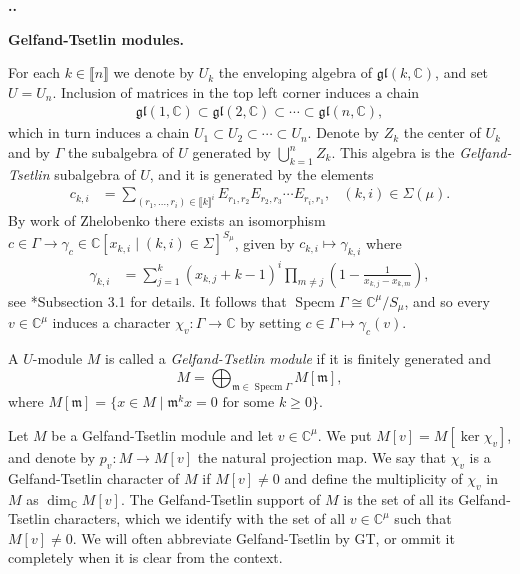 \documentclass[11pt,fleqn]{amsart}
\renewcommand\thesection{\arabic{section}}
\newcounter{para}[section]
\renewcommand\thepara{\thesection.\arabic{para}}
\def\paragraph{%
 \noindent
 \refstepcounter{para}%
 \textbf{\thepara.}\hspace{1ex}%
}
\newcommand\about[1]{%
 {\bfseries#1.}%
}
\newcommand\CC{\mathbb C}
\renewcommand\to{\rightarrow}
\newcommand\m{\mathfrak m}
\newcommand\gl{\mathfrak{gl}}
\newcommand\interval[1]{\llbracket #1 \rrbracket}
\DeclareMathOperator\Specm{Specm}
\begin{document}
\paragraph
\about{Gelfand-Tsetlin modules}
For each $k \in \interval{n}$ we denote by $U_k$ the enveloping algebra of 
$\gl(k,\CC)$, and set $U = U_n$. Inclusion of matrices in the top left corner 
induces a chain
\begin{align*}
\gl(1,\CC) \subset \gl(2, \CC) \subset \cdots \subset \gl(n,\CC),
\end{align*}
which in turn induces a chain $U_1 \subset U_2 \subset \cdots \subset U_n$. 
Denote by $Z_k$ the center of $U_k$ and by $\Gamma$ the subalgebra of $U$ 
generated by $\bigcup_{k=1}^n Z_k$. This algebra is the \emph{Gelfand-Tsetlin} 
subalgebra of $U$, and it is generated by the elements
\begin{align*}
c_{k,i}
  &= \sum_{(r_1, \ldots, r_i) \in \interval{k}^i} 
    E_{r_1, r_2} E_{r_2, r_3} \cdots E_{r_i, r_1},
  & (k,i) \in \Sigma(\mu).
\end{align*}
By work of Zhelobenko there exists an isomorphism $c \in \Gamma \to \gamma_c
\in \CC[x_{k,i} \mid (k,i) \in \Sigma]^{S_\mu}$, given by $c_{k,i} \mapsto 
\gamma_{k,i}$ where
\begin{align*}
\gamma_{k,i}
  &= \sum_{j=1}^k (x_{k,j} + k - 1)^i 
    \prod_{m \neq j} \left( 
      1 - \frac{1}{x_{k,j} - x_{k,m}}
    \right),
\end{align*}
see \cite{FGR16}*{Subsection 3.1} for details. 
It follows that $\Specm \Gamma \cong \CC^\mu / S_\mu$, and so every 
$v \in \CC^\mu$ induces a character $\chi_v: \Gamma \to \CC$ by setting
$c \in \Gamma \mapsto \gamma_c(v)$. 
\begin{Definition*}
A $U$-module $M$ is called a \emph{Gelfand-Tsetlin module} if it is finitely
generated and
\[
  M = \bigoplus_{\m \in \Specm \Gamma} M[\mathfrak m],
\] 
where $M[\mathfrak m] = \{x \in M \mid \mathfrak m^k x = 0 \mbox{ for some } k 
\geq 0\}$.
\end{Definition*}
Let $M$ be a Gelfand-Tsetlin module and let $v \in \CC^\mu$. We put
$M[v] = M[\ker \chi_v]$, and denote by $p_v: M \to M[v]$ the natural projection
map. We say that $\chi_v$ is a Gelfand-Tsetlin character of $M$ if $M[v] \neq 
0$ and define the multiplicity of $\chi_v$ in $M$ as $\dim_\CC M[v]$. The 
Gelfand-Tsetlin support of $M$ is the set of all its Gelfand-Tsetlin 
characters, which we identify with the set of all $v \in \CC^\mu$ such that
$M[v] \neq 0$. We will often abbreviate Gelfand-Tsetlin by GT, or ommit it
completely when it is clear from the context.
\end{document}
